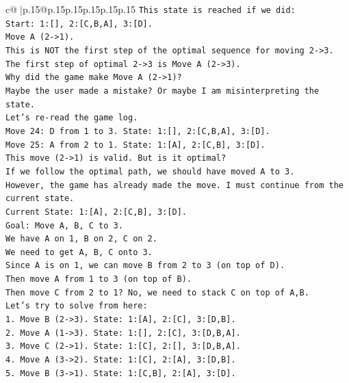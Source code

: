 \documentclass{article}
\begin{document}
{\begin{supertabular}{c@{$\;$}|p{.15\linewidth}@{}p{.15\linewidth}p{.15\linewidth}p{.15\linewidth}p{.15\linewidth}p{.15\linewidth}}
{{{\texttt{This state is reached if we did:} \\
\texttt{Start: 1:{[}{]}, 2:{[}C,B,A{]}, 3:{[}D{]}.} \\
\texttt{Move A (2{-}>1).} \\
\texttt{This is NOT the first step of the optimal sequence for moving 2{-}>3.} \\
\texttt{The first step of optimal 2{-}>3 is Move A (2{-}>3).} \\
\texttt{Why did the game make Move A (2{-}>1)?} \\
\texttt{Maybe the user made a mistake? Or maybe I am misinterpreting the state.} \\
\texttt{Let's re{-}read the game log.} \\
\texttt{Move 24: D from 1 to 3. State: 1:{[}{]}, 2:{[}C,B,A{]}, 3:{[}D{]}.} \\
\texttt{Move 25: A from 2 to 1. State: 1:{[}A{]}, 2:{[}C,B{]}, 3:{[}D{]}.} \\
\texttt{This move (2{-}>1) is valid. But is it optimal?} \\
\texttt{If we follow the optimal path, we should have moved A to 3.} \\
\texttt{However, the game has already made the move. I must continue from the current state.} \\
\texttt{Current State: 1:{[}A{]}, 2:{[}C,B{]}, 3:{[}D{]}.} \\
\texttt{Goal: Move A, B, C to 3.} \\
\texttt{We have A on 1, B on 2, C on 2.} \\
\texttt{We need to get A, B, C onto 3.} \\
\texttt{Since A is on 1, we can move B from 2 to 3 (on top of D).} \\
\texttt{Then move A from 1 to 3 (on top of B).} \\
\texttt{Then move C from 2 to 1? No, we need to stack C on top of A,B.} \\
\texttt{Let's try to solve from here:} \\
\texttt{1. Move B (2{-}>3). State: 1:{[}A{]}, 2:{[}C{]}, 3:{[}D,B{]}.} \\
\texttt{2. Move A (1{-}>3). State: 1:{[}{]}, 2:{[}C{]}, 3:{[}D,B,A{]}.} \\
\texttt{3. Move C (2{-}>1). State: 1:{[}C{]}, 2:{[}{]}, 3:{[}D,B,A{]}.} \\
\texttt{4. Move A (3{-}>2). State: 1:{[}C{]}, 2:{[}A{]}, 3:{[}D,B{]}.} \\
\texttt{5. Move B (3{-}>1). State: 1:{[}C,B{]}, 2:{[}A{]}, 3:{[}D{]}.} \\
}}}
\end{supertabular}}
\end{document}
